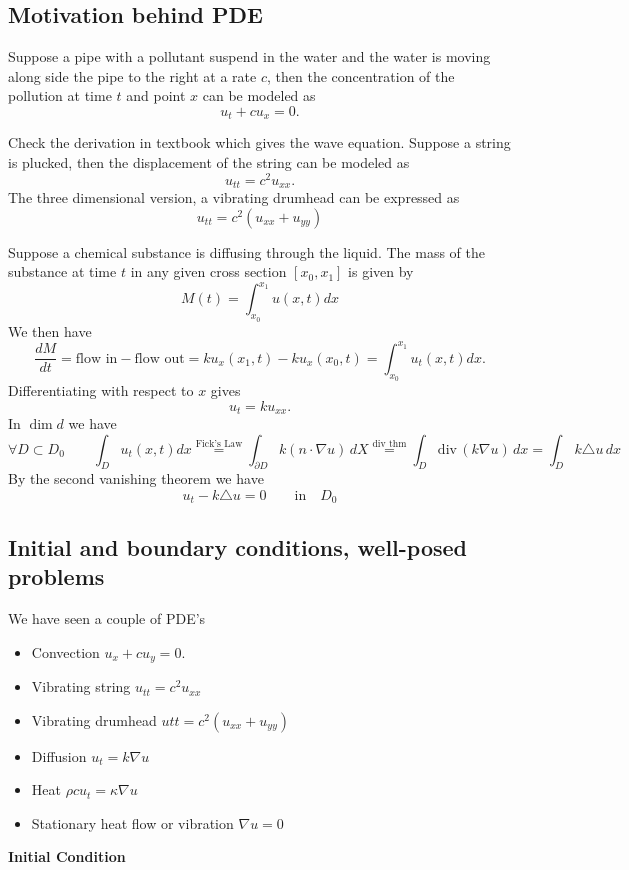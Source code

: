 \subsection{Motivation behind PDE}
\begin{example}[Transport]
	Suppose a pipe with a pollutant suspend in the water and the water is moving along side the pipe to the right at a rate $c$, then the concentration of the pollution at time $t$ and point $x$ can be modeled as
	\[ u_t  + c u_x = 0.\]
\end{example}
\begin{example}
	Check the derivation in textbook which gives the wave equation. Suppose a string is plucked, then the displacement of the string can be modeled as
	\[ u_{tt} = c^2 u_{xx}.\]
	The three dimensional version, a vibrating drumhead can be expressed as
	\[ u_{tt} = c^2 \left( u_{xx} + u_{yy} \right) \]
\end{example}
\begin{example}[Diffusion]
	Suppose a chemical substance is diffusing through the liquid. The mass of the substance at time $t$ in any given cross section $[x_0,x_1]$ is given by
	\[ M(t) = \int_{x_0}^{x_1} u(x,t) dx\]
	We then have
	\[ \frac{dM}{dt} = \text{flow in} - \text{flow out} = ku_x(x_1,t) - ku_x(x_0,t) = \int_{x_0}^{x_1} u_t(x,t) dx.\]
	Differentiating with respect to $x$ gives
	\[u_t = k u_{xx}.\]
	In $\dim d$ we have 
	\[ \forall D \subset D_0 \qquad \int_D u_t(x,t) dx \stackrel{\text{Fick's Law}}{=} \int_{\partial D} k(n \cdot \nabla u) \, dX \stackrel{\text{div thm}}{=} \int_{D} \mathrm{div}\,(k\nabla u)\, dx = \int_D k \triangle u\, dx\]
	By the second vanishing theorem we have
	\[ u_t - k \triangle u = 0 \qquad \mathrm{in} \quad D_0\]
\end{example}
\subsection{Initial and boundary conditions, well-posed problems}
We have seen a couple of PDE's
\begin{itemize}
	\item Convection $u_{x} + c u_{y} = 0$.
	\item Vibrating string $u_{tt} = c^2 u_{xx}$
	\item Vibrating drumhead $utt = c^2 \left( u_{xx}  + u_{yy} \right) $
	\item Diffusion $u_t = k \nabla u$
	\item Heat $\rho c u_{t}  = \kappa \nabla u$
	\item Stationary heat flow or vibration $\nabla u = 0$
\end{itemize}
 \textbf{Initial Condition} 

